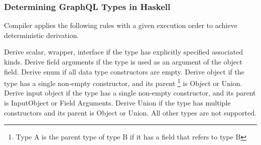 \begin{frame}[noframenumbering]\frametitle{Determining GraphQL Types in Haskell}
Compiler applies the following rules with a given execution order to achieve deterministic derivation.
\begin{enumerate}
   Derive scalar, wrapper, interface if the type has explicitly specified associated kinds. 
   Derive field arguments if the type is used as an argument of the object field. 
   Derive enum if all data type constructors are empty.
   Derive object if the type has a single non-empty constructor, and its parent \footnote{Type A is the parent type of type B if it has a field that refers to type B} is Object or Union. 
   Derive input object if the type has a single non-empty constructor, and its parent is InputObject or Field Arguments.
   Derive Union if the type has multiple constructors and its parent is Object or Union.
   All other types are not supported.
\end{enumerate}
\end{frame}
